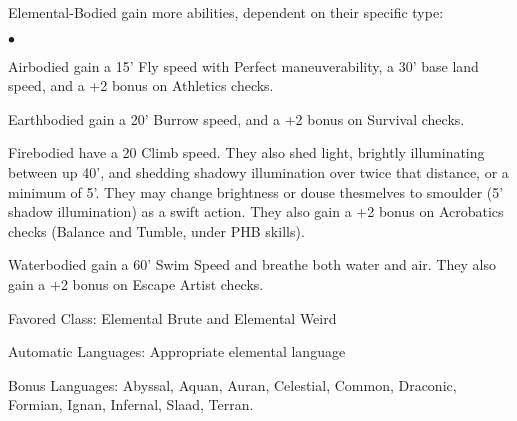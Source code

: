 Elemental-Bodied gain more abilities, dependent on their specific type:
\begin{list}{$\bullet$}{\itemspace}
    \item Airbodied gain a 15' Fly speed with Perfect maneuverability, a 30' base land speed, and a +2 bonus on Athletics checks.
    \item Earthbodied gain a 20' Burrow speed, and a +2 bonus on Survival checks.
    \item Firebodied have a 20 Climb speed.  They also shed light, brightly illuminating between up 40', and shedding shadowy illumination  over twice that distance, or a minimum of 5'.  They may change brightness or douse thesmelves to smoulder (5' shadow illumination) as a swift action.  They also gain a +2 bonus on Acrobatics checks (Balance and Tumble, under PHB skills).
    \item Waterbodied gain a 60' Swim Speed and breathe both water and air.  They also gain a +2 bonus on Escape Artist checks.
    \item Favored Class: Elemental Brute and Elemental Weird
    \item Automatic Languages: Appropriate elemental language
    \item Bonus Languages: Abyssal, Aquan, Auran, Celestial, Common, Draconic, Formian, Ignan, Infernal, Slaad, Terran.
\end{list}
